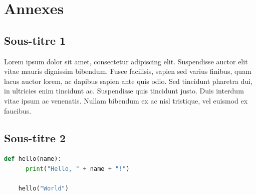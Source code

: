 \documentclass[12pt, a4paper, oneside]{Thesis}
\begin{document}
\newpage

\newpage

\section{Annexes}

\subsection{Sous-titre 1}


Lorem ipsum dolor sit amet, consectetur adipiscing elit. Suspendisse auctor elit vitae mauris dignissim bibendum. Fusce facilisis, sapien sed varius finibus, quam lacus auctor lorem, ac dapibus sapien ante quis odio. Sed tincidunt pharetra dui, in ultricies enim tincidunt ac. Suspendisse quis tincidunt justo. Duis interdum vitae ipsum ac venenatis. Nullam bibendum ex ac nisl tristique, vel euismod ex faucibus.\\

\subsection{Sous-titre 2}

\begin{lstlisting}[language=Python, caption={Exemple de code Python}, label=mon-code-python]
	def hello(name):
	  print("Hello, " + name + "!")
	
	hello("World")
\end{lstlisting}
\end{document}
